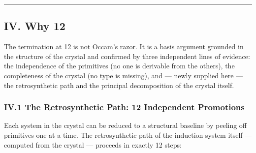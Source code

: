 \documentclass[12pt,a4paper]{article}
\begin{document}
\begin{center}
\rule{0.5\textwidth}{0.4pt}
\end{center}

\subsection{IV. Why 12}

The termination at 12 is not Occam's razor. It is a basis argument grounded in the structure of the crystal and confirmed by three independent lines of evidence: the independence of the primitives (no one is derivable from the others), the completeness of the crystal (no type is missing), and --- newly supplied here --- the retrosynthetic path and the principal decomposition of the crystal itself.

\subsubsection{IV.1 The Retrosynthetic Path: 12 Independent Promotions}

Each system in the crystal can be reduced to a structural baseline by peeling off primitives one at a time. The retrosynthetic path of the induction system itself --- computed from the crystal --- proceeds in exactly 12 steps:
\end{document}
